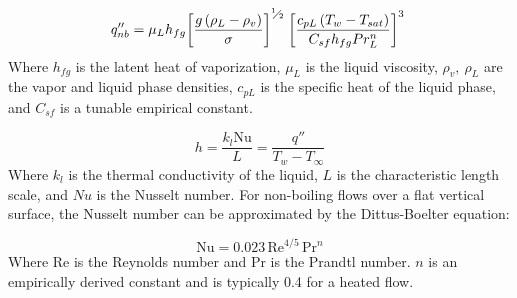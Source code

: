 \begin{equation}
q''_{nb} = {{\mu }_{L}}{{h}_{fg}}{{\left[ \frac{g\left( {{\rho }_{L}}-{{\rho }_{v}} \right)}{\sigma } \right]}^{{}^{1}\!\!\diagup\!\!{}_{2}\;}}{{\left[ \frac{{{c}_{pL}}\left( {{T}_{w}}-{{T}_{sat}} \right)}{{{C}_{sf}}{{h}_{fg}}Pr_{L}^{n}} \right]}^{3}\;}
\label{eq:ros}
\end{equation}
Where $h_{fg}$ is the latent heat of vaporization, $\mu_L$ is the liquid viscosity, $\rho_v,\ \rho_L$ are the vapor and liquid phase densities, ${c}_{pL}$ is the specific heat of the liquid phase, and ${C}_{sf}$ is a tunable empirical constant.

\begin{equation}
h = \frac{k_l \mathrm{Nu}}{L} = \frac{q''}{T_w-T_{\infty}}
\label{eq:htc}
\end{equation}
Where $k_l$ is the thermal conductivity of the liquid, $L$ is the characteristic length scale, and $Nu$ is the Nusselt number.  For non-boiling flows over a flat vertical surface, the Nusselt number can be approximated by the
Dittus-Boelter equation:

\begin{equation}
\mathrm{Nu} = 0.023\, \mathrm{Re}^{4/5}\, \mathrm{Pr}^{n}
\label{eq:db}
\end{equation} 
Where $\mathrm{Re}$ is the Reynolds number and $\mathrm{Pr}$ is the Prandtl number.  $n$ is an empirically derived constant and is typically 0.4 for a heated flow.
